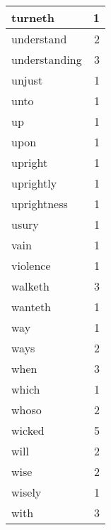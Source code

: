 \begin{center}
\begin{longtable}{l|r}
turneth & 1\\ \hline 
understand & 2\\ \hline 
understanding & 3\\ \hline 
unjust & 1\\ \hline 
unto & 1\\ \hline 
up & 1\\ \hline 
upon & 1\\ \hline 
upright & 1\\ \hline 
uprightly & 1\\ \hline 
uprightness & 1\\ \hline 
usury & 1\\ \hline 
vain & 1\\ \hline 
violence & 1\\ \hline 
walketh & 3\\ \hline 
wanteth & 1\\ \hline 
way & 1\\ \hline 
ways & 2\\ \hline 
when & 3\\ \hline 
which & 1\\ \hline 
whoso & 2\\ \hline 
wicked & 5\\ \hline 
will & 2\\ \hline 
wise & 2\\ \hline 
wisely & 1\\ \hline 
with & 3\\ \hline 
\end{longtable}  
\end{center}  


  
\normalsize  

  
  
